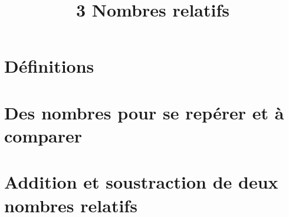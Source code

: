 \documentclass[12pt,a4paper]{article}
\date{}
\title{\textcircled{{\normalsize{3}}} Nombres relatifs}
\begin{document}
	
	\maketitle



\section{Définitions}



\newpage
\section{Des nombres pour se repérer et à comparer}



 \newpage
 
\section{Addition et soustraction de deux nombres relatifs}


%
%
%
%
\end{document}
